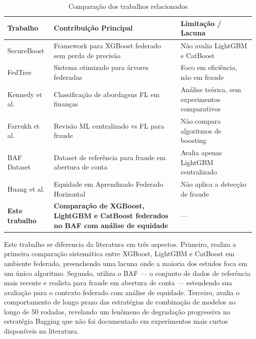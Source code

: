\begin{table}[H]
\centering
\small
\begin{tabularx}{\textwidth}{|l|X|X|}
\hline
\textbf{Trabalho} & \textbf{Contribuição Principal} & \textbf{Limitação / Lacuna} \\
\hline
SecureBoost \cite{cheng2021secureboost} & Framework para XGBoost federado sem perda de precisão & Não avalia LightGBM e CatBoost \\
\hline
FedTree \cite{li2023fedtree} & Sistema otimizado para árvores federadas & Foco em eficiência, não em fraude \\
\hline
Kennedy et al. \cite{kennedy2025financial} & Classificação de abordagens FL em finanças & Análise teórica, sem experimentos comparativos \\
\hline
Farrukh et al. \cite{farrukh2025blockchain} & Revisão ML centralizado vs FL para fraude & Não compara algoritmos de boosting \\
\hline
BAF Dataset \cite{jesus2022baf} & Dataset de referência para fraude em abertura de conta & Avalia apenas LightGBM centralizado \\
\hline
Huang et al. \cite{huang2022fairness} & Equidade em Aprendizado Federado Horizontal & Não aplica a detecção de fraude \\
\hline
\textbf{Este trabalho} & \textbf{Comparação de XGBoost, LightGBM e CatBoost federados no BAF com análise de equidade} & --- \\
\hline
\end{tabularx}
\caption{Comparação dos trabalhos relacionados}
\label{tab:trabalhos_relacionados}
\end{table}

Este trabalho se diferencia da literatura em três aspectos. Primeiro, realiza a primeira comparação sistemática entre XGBoost, LightGBM e CatBoost em ambiente federado, preenchendo uma lacuna onde a maioria dos estudos foca em um único algoritmo. Segundo, utiliza o BAF --- o conjunto de dados de referência mais recente e realista para fraude em abertura de conta --- estendendo sua avaliação para o contexto federado com análise de equidade. Terceiro, avalia o comportamento de longo prazo das estratégias de combinação de modelos ao longo de 50 rodadas, revelando um fenômeno de degradação progressiva na estratégia Bagging que não foi documentado em experimentos mais curtos disponíveis na literatura.
